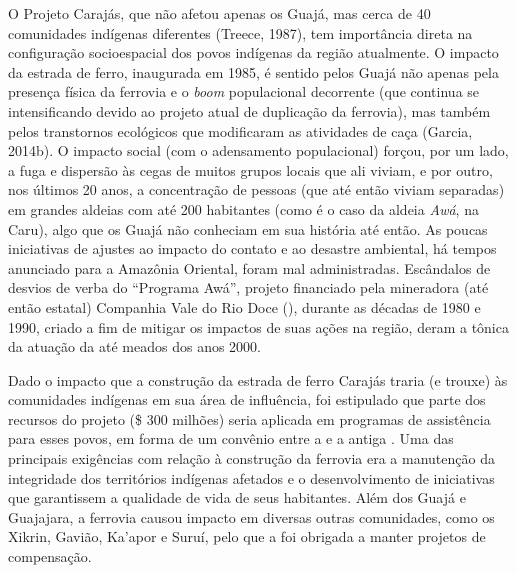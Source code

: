O Projeto Carajás, que não afetou apenas os Guajá, mas cerca de 40
comunidades indígenas diferentes (Treece, 1987), tem importância direta
na configuração socioespacial dos povos indígenas da região atualmente.
O impacto da estrada de ferro, inaugurada em 1985, é sentido pelos Guajá
não apenas pela presença física da ferrovia e o \emph{boom} populacional
decorrente (que continua se intensificando devido ao projeto atual de
duplicação da ferrovia), mas também pelos transtornos ecológicos que
modificaram as atividades de caça (Garcia, 2014b). O impacto social (com
o adensamento populacional) forçou, por um lado, a fuga e dispersão às
cegas de muitos grupos locais que ali viviam, e por outro, nos últimos
20 anos, a concentração de pessoas (que até então viviam separadas) em
grandes aldeias com até 200 habitantes (como é o caso da aldeia
\emph{Awá}, na  Caru), algo que os Guajá não conheciam em sua história
até então. As poucas iniciativas de ajustes ao impacto do contato e ao
desastre ambiental, há tempos anunciado para a Amazônia Oriental, foram
mal administradas. Escândalos de desvios de verba do ``Programa Awá'',
projeto financiado pela mineradora (até então estatal) Companhia Vale do
Rio Doce (), durante as décadas de 1980 e 1990, criado a fim de
mitigar os impactos de suas ações na região, deram a tônica da atuação
da  até meados dos anos 2000.

Dado o impacto que a construção da estrada de ferro Carajás traria (e
trouxe) às comunidades indígenas em sua área de influência, foi
estipulado que parte dos recursos do projeto (\$ 300 milhões) seria
aplicada em programas de assistência para esses povos, em forma de um
convênio entre a  e a antiga . Uma das principais exigências
com relação à construção da ferrovia era a manutenção da integridade dos
territórios indígenas afetados e o desenvolvimento de iniciativas que
garantissem a qualidade de vida de seus habitantes. Além dos Guajá e
Guajajara, a ferrovia causou impacto em diversas outras comunidades,
como os Xikrin, Gavião, Ka'apor e Suruí, pelo que a  foi obrigada a
manter projetos de compensação.

